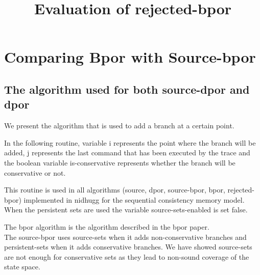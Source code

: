 \documentclass[a4paper,10pt]{article}
\title{Evaluation of rejected-bpor}
\date{}
\begin{document}
\maketitle

\section*{Comparing Bpor with Source-bpor}

\subsection*{The algorithm used for both source-dpor and dpor}

We present the algorithm that is used to add a branch at a certain point.

In the following routine, variable i represents the point where the branch will be added, j represents the last command that has
been executed by the trace and the boolean variable is-conservative represents whether the branch will be conservative or not.

This routine is used in all algorithms (source, dpor, source-bpor, bpor, rejected-bpor) implemented in nidhugg for the sequential consistency memory
model. When the persistent sets are used the variable source-sets-enabled is set false.

The bpor algorithm is the algorithm described in the bpor paper. \\
The source-bpor uses source-sets when it adds non-conservative branches and persistent-sets when it adds conservative branches. 
We have showed source-sets are not enough for conservative sets as they lead to non-sound coverage of the state space.\\
\end{document}
